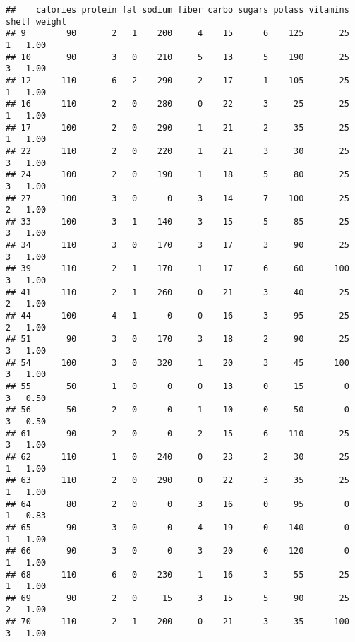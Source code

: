 \documentclass[
]{article}
\newenvironment{Shaded}{\begin{snugshade}}{\end{snugshade}}
\newcommand{\DecValTok}[1]{\textcolor[rgb]{0.00,0.00,0.81}{#1}}
\newcommand{\NormalTok}[1]{#1}
\newcommand{\SpecialCharTok}[1]{\textcolor[rgb]{0.00,0.00,0.00}{#1}}
\begin{document}
\begin{Shaded}
\end{Shaded}

\begin{verbatim}
##    calories protein fat sodium fiber carbo sugars potass vitamins shelf weight
## 9        90       2   1    200     4    15      6    125       25     1   1.00
## 10       90       3   0    210     5    13      5    190       25     3   1.00
## 12      110       6   2    290     2    17      1    105       25     1   1.00
## 16      110       2   0    280     0    22      3     25       25     1   1.00
## 17      100       2   0    290     1    21      2     35       25     1   1.00
## 22      110       2   0    220     1    21      3     30       25     3   1.00
## 24      100       2   0    190     1    18      5     80       25     3   1.00
## 27      100       3   0      0     3    14      7    100       25     2   1.00
## 33      100       3   1    140     3    15      5     85       25     3   1.00
## 34      110       3   0    170     3    17      3     90       25     3   1.00
## 39      110       2   1    170     1    17      6     60      100     3   1.00
## 41      110       2   1    260     0    21      3     40       25     2   1.00
## 44      100       4   1      0     0    16      3     95       25     2   1.00
## 51       90       3   0    170     3    18      2     90       25     3   1.00
## 54      100       3   0    320     1    20      3     45      100     3   1.00
## 55       50       1   0      0     0    13      0     15        0     3   0.50
## 56       50       2   0      0     1    10      0     50        0     3   0.50
## 61       90       2   0      0     2    15      6    110       25     3   1.00
## 62      110       1   0    240     0    23      2     30       25     1   1.00
## 63      110       2   0    290     0    22      3     35       25     1   1.00
## 64       80       2   0      0     3    16      0     95        0     1   0.83
## 65       90       3   0      0     4    19      0    140        0     1   1.00
## 66       90       3   0      0     3    20      0    120        0     1   1.00
## 68      110       6   0    230     1    16      3     55       25     1   1.00
## 69       90       2   0     15     3    15      5     90       25     2   1.00
## 70      110       2   1    200     0    21      3     35      100     3   1.00

\end{verbatim}
\end{document}
